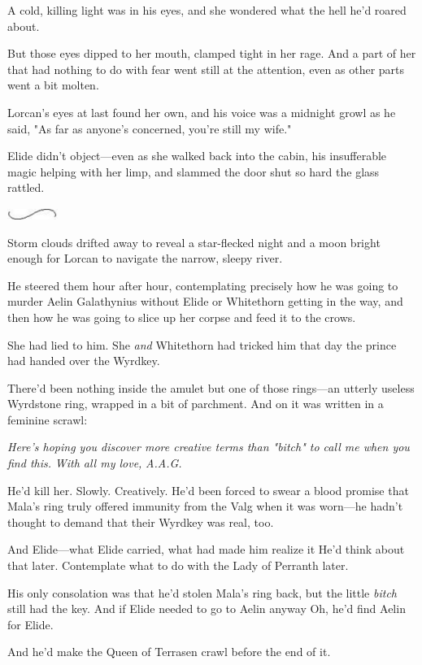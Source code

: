 A cold, killing light was in his eyes, and she wondered what the hell he'd roared about.

But those eyes dipped to her mouth, clamped tight in her rage. And a part of her that had nothing to do with fear went still at the attention, even as other parts went a bit molten.

Lorcan's eyes at last found her own, and his voice was a midnight growl as he said, "As far as anyone's concerned, you're still my wife."

Elide didn't object---even as she walked back into the cabin, his insufferable magic helping with her limp, and slammed the door shut so hard the glass rattled.

\includegraphics[width=0.65in,height=0.13in]{images/seperator}

Storm clouds drifted away to reveal a star-flecked night and a moon bright enough for Lorcan to navigate the narrow, sleepy river.

He steered them hour after hour, contemplating precisely how he was going to murder Aelin Galathynius without Elide or Whitethorn getting in the way, and then how he was going to slice up her corpse and feed it to the crows.

She had lied to him. She \emph{and} Whitethorn had tricked him that day the prince had handed over the Wyrdkey.

There'd been nothing inside the amulet but one of those rings---an utterly useless Wyrdstone ring, wrapped in a bit of parchment. And on it was written in a feminine scrawl:

\emph{Here's hoping you discover more creative terms than "bitch" to call me when you find this.} \emph{With all my love,} \emph{A.A.G.}

He'd kill her. Slowly. Creatively. He'd been forced to swear a blood promise that Mala's ring truly offered immunity from the Valg when it was worn---he hadn't thought to demand that their Wyrdkey was real, too.

And Elide---what Elide carried, what had made him realize it 
He'd think about that later. Contemplate what to do with the Lady of Perranth later.

His only consolation was that he'd stolen Mala's ring back, but the little \emph{bitch} still had the key. And if Elide needed to go to Aelin anyway  Oh, he'd find Aelin for Elide.

And he'd make the Queen of Terrasen crawl before the end of it.
